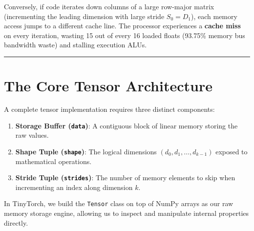 \documentclass[
  letterpaper,
]{scrbook}
\providecommand{\tightlist}{%
  \setlength{\itemsep}{0pt}\setlength{\parskip}{0pt}}
\begin{document}
Conversely, if code iterates down columns of a large row-major matrix
(incrementing the leading dimension with large stride \(S_0 = D_1\)),
each memory access jumps to a different cache line. The processor
experiences a \textbf{cache miss} on every iteration, wasting 15 out of
every 16 loaded floats (93.75\% memory bus bandwidth waste) and stalling
execution ALUs.

\begin{center}\rule{0.5\linewidth}{0.5pt}\end{center}

\section{The Core Tensor
Architecture}\label{the-core-tensor-architecture}

A complete tensor implementation requires three distinct components:

\begin{enumerate}
\def\labelenumi{\arabic{enumi}.}
\tightlist
\item
  \textbf{Storage Buffer (\texttt{data})}: A contiguous block of linear
  memory storing the raw values.
\item
  \textbf{Shape Tuple (\texttt{shape})}: The logical dimensions
  \((d_0, d_1, \dots, d_{k-1})\) exposed to mathematical operations.
\item
  \textbf{Stride Tuple (\texttt{strides})}: The number of memory
  elements to skip when incrementing an index along dimension \(k\).
\end{enumerate}

In TinyTorch, we build the \texttt{Tensor} class on top of NumPy arrays
as our raw memory storage engine, allowing us to inspect and manipulate
internal properties directly.
\end{document}
